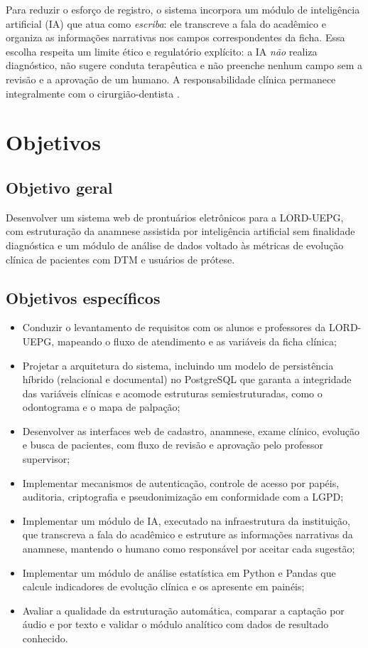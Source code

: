 Para reduzir o esforço de registro, o sistema incorpora um módulo de inteligência artificial (IA) que atua como \emph{escriba}: ele transcreve a fala do acadêmico e organiza as informações narrativas nos campos correspondentes da ficha. Essa escolha respeita um limite ético e regulatório explícito: a IA \emph{não} realiza diagnóstico, não sugere conduta terapêutica e não preenche nenhum campo sem a revisão e a aprovação de um humano. A responsabilidade clínica permanece integralmente com o cirurgião-dentista \cite{cfo118-2012}.

\section{Objetivos}

\subsection{Objetivo geral}

Desenvolver um sistema web de prontuários eletrônicos para a LORD-UEPG, com estruturação da anamnese assistida por inteligência artificial sem finalidade diagnóstica e um módulo de análise de dados voltado às métricas de evolução clínica de pacientes com DTM e usuários de prótese.

\subsection{Objetivos específicos}

\begin{itemize}
	\item Conduzir o levantamento de requisitos com os alunos e professores da LORD-UEPG, mapeando o fluxo de atendimento e as variáveis da ficha clínica;
	\item Projetar a arquitetura do sistema, incluindo um modelo de persistência híbrido (relacional e documental) no PostgreSQL que garanta a integridade das variáveis clínicas e acomode estruturas semiestruturadas, como o odontograma e o mapa de palpação;
	\item Desenvolver as interfaces web de cadastro, anamnese, exame clínico, evolução e busca de pacientes, com fluxo de revisão e aprovação pelo professor supervisor;
	\item Implementar mecanismos de autenticação, controle de acesso por papéis, auditoria, criptografia e pseudonimização em conformidade com a LGPD;
	\item Implementar um módulo de IA, executado na infraestrutura da instituição, que transcreva a fala do acadêmico e estruture as informações narrativas da anamnese, mantendo o humano como responsável por aceitar cada sugestão;
	\item Implementar um módulo de análise estatística em Python e Pandas que calcule indicadores de evolução clínica e os apresente em painéis;
	\item Avaliar a qualidade da estruturação automática, comparar a captação por áudio e por texto e validar o módulo analítico com dados de resultado conhecido.
\end{itemize}

